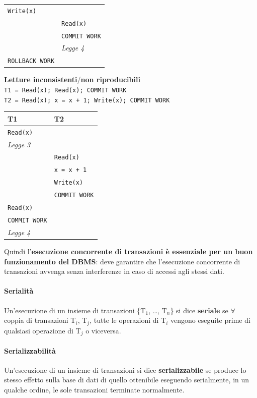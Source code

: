 \documentclass[10pt]{book}
\begin{document}
\begin{list}{}{}
\begin{list}{}{}
\begin{center}
\begin{tabular}{l | l}
				\texttt{Write(x)} & \\
				& \texttt{Read(x)}\\
				& \texttt{COMMIT WORK}\\
				& \textit{Legge 4} \\
				\texttt{ROLLBACK WORK} &
			\end{tabular}
		\end{center}
		\item \textbf{Letture inconsistenti}/\textbf{non riproducibili}\\
		\texttt{T1 = Read(x); Read(x); COMMIT WORK}\\
		\texttt{T2 = Read(x);  x = x + 1; Write(x); COMMIT WORK}
		\begin{center}
			\begin{tabular}{l | l}
				T1 & T2\\
				\hline
				\texttt{Read(x)} & \\
				\textit{Legge 3} & \\
				& \texttt{Read(x)}\\
				& \texttt{x = x + 1}\\
				& \texttt{Write(x)}\\
				& \texttt{COMMIT WORK}\\
				\texttt{Read(x)} & \\
				\texttt{COMMIT WORK} & \\
				\textit{Legge 4}
			\end{tabular}
		\end{center}
	\end{list}
	Quindi l'\textbf{esecuzione concorrente di transazioni è essenziale per un buon funzionamento del DBMS}: deve garantire che l'esecuzione concorrente di transazioni avvenga senza interferenze in caso di accessi agli stessi dati.
\end{list}
\paragraph{Serialità} Un'esecuzione di un insieme di transazioni \{T$_1$, \ldots, T$_n$\} si dice \textbf{seriale} se $\forall$ coppia di transazioni T$_i$, T$_j$, tutte le operazioni di T$_i$ vengono eseguite prime di qualsiasi operazione di T$_j$ o viceversa.
\paragraph{Serializzabilità} Un'esecuzione di un insieme di transazioni si dice \textbf{serializzabile} se produce lo stesso effetto sulla base di dati di quello ottenibile eseguendo serialmente, in un qualche ordine, le sole transazioni terminate normalmente.
\end{document}
